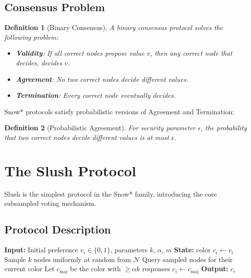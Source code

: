 \documentclass[11pt,a4paper]{article}
\newtheorem{definition}{Definition}
\begin{document}
\subsection{Consensus Problem}

\begin{definition}[Binary Consensus]
A binary consensus protocol solves the following problem:
\begin{itemize}
    \item \textbf{Validity}: If all correct nodes propose value $v$, then any correct node that decides, decides $v$.
    \item \textbf{Agreement}: No two correct nodes decide different values.
    \item \textbf{Termination}: Every correct node eventually decides.
\end{itemize}
\end{definition}

Snow* protocols satisfy probabilistic versions of Agreement and Termination:

\begin{definition}[Probabilistic Agreement]
For security parameter $\epsilon$, the probability that two correct nodes decide different values is at most $\epsilon$.
\end{definition}

\section{The Slush Protocol}

Slush is the simplest protocol in the Snow* family, introducing the core subsampled voting mechanism.

\subsection{Protocol Description}

\begin{algorithm}
\caption{Slush Protocol for Node $i$}
\begin{algorithmic}[1]
\STATE \textbf{Input:} Initial preference $v_i \in \{0, 1\}$, parameters $k$, $\alpha$, $m$
\STATE \textbf{State:} color $c_i \gets v_i$
    \STATE Sample $k$ nodes uniformly at random from $\mathcal{N}$
    \STATE Query sampled nodes for their current color
    \STATE Let $c_{\text{maj}}$ be the color with $\geq \alpha k$ responses
        \STATE $c_i \gets c_{\text{maj}}$
    \ENDIF
\ENDFOR
\STATE \textbf{Output:} $c_i$
\end{algorithmic}
\end{algorithm}
\end{document}
